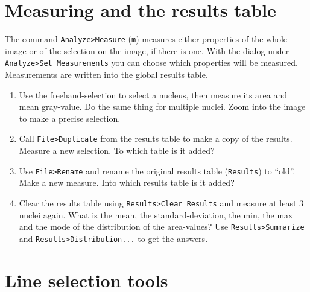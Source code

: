 \section{Measuring and the results table}

The command \texttt{Analyze>Measure} (\texttt{m}) measures either properties of the whole image or of the selection on the image, if there is one. With the dialog under \texttt{Analyze>Set Measurements} you can choose which properties will be measured. Measurements are written into the global results table.

\begin{enumerate}
\item Use the freehand-selection to select a nucleus, then measure its area and mean gray-value. Do the same thing for multiple nuclei. Zoom into the image to make a precise selection.

\item Call \texttt{File>Duplicate} from the results table to make a copy of the results. Measure a new selection. To which table is it added?

\fbox{
	\begin{minipage}{\linewidth}
		\hfill\vspace{1cm}
	\end{minipage}
	}
	
\item Use \texttt{File>Rename} and rename the original results table (\texttt{Results}) to ``old''. Make a new measure. Into which results table is it added?

\fbox{
	\begin{minipage}{\linewidth}
		\hfill\vspace{1cm}
	\end{minipage}
	}
	
\item Clear the results table using \texttt{Results>Clear Results} and measure at least 3 nuclei again. What is the mean, the standard-deviation, the min, the max and the mode of the distribution of the area-values? Use \texttt{Results>Summarize} and \texttt{Results>Distribution...} to get the answers.

\fbox{
	\begin{minipage}{\linewidth}
		\hfill\vspace{2cm}
	\end{minipage}
	}

\end{enumerate}

\section{Line selection tools}

